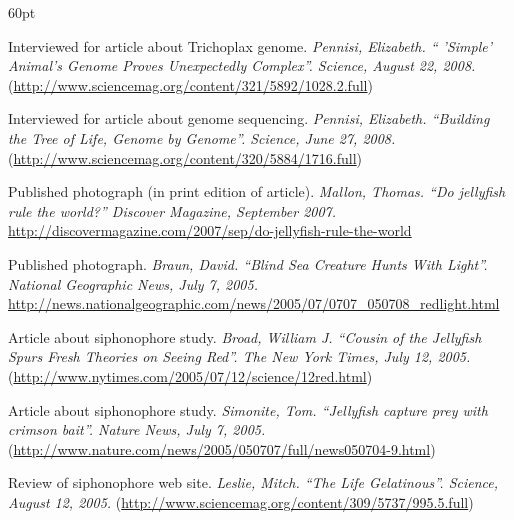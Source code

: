 \begin{entry}{60pt}
\item [\rm 2008] Interviewed for article about Trichoplax genome. \emph{Pennisi, Elizabeth. `` 'Simple' Animal's Genome Proves Unexpectedly Complex''. Science, August 22, 2008.} (\url{http://www.sciencemag.org/content/321/5892/1028.2.full})
\item [\rm 2008] Interviewed for article about genome sequencing. \emph{Pennisi, Elizabeth. ``Building the Tree of Life, Genome by Genome''. Science, June 27, 2008.} (\url{http://www.sciencemag.org/content/320/5884/1716.full})
\item [\rm 2005] Published photograph (in print edition of article). \emph{Mallon, Thomas. ``Do jellyfish rule the world?'' Discover Magazine, September 2007.} \url{http://discovermagazine.com/2007/sep/do-jellyfish-rule-the-world}
\item [\rm 2005] Published photograph. \emph{Braun, David. ``Blind Sea Creature Hunts With Light''. National Geographic News, July 7, 2005.} \url{http://news.nationalgeographic.com/news/2005/07/0707_050708_redlight.html}
\item [\rm 2005] Article about siphonophore study. \emph{Broad, William J. ``Cousin of the Jellyfish Spurs Fresh Theories on Seeing Red''. The New York Times, July 12, 2005.} (\url{http://www.nytimes.com/2005/07/12/science/12red.html})
\item [\rm 2005] Article about siphonophore study. \emph{Simonite, Tom. ``Jellyfish capture prey with crimson bait''. Nature News, July 7, 2005.} (\url{http://www.nature.com/news/2005/050707/full/news050704-9.html})
\item [\rm 2005] Review of siphonophore web site. \emph{Leslie, Mitch. ``The Life Gelatinous''. Science, August 12, 2005.} (\url{http://www.sciencemag.org/content/309/5737/995.5.full})

\end{entry}